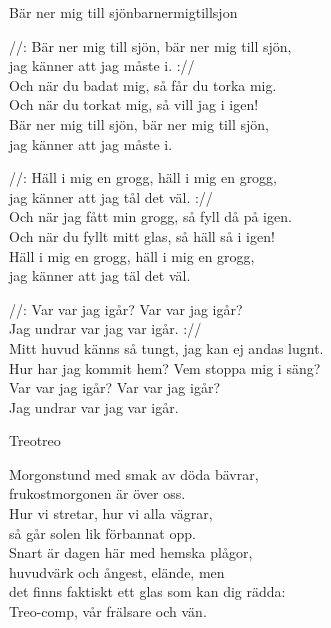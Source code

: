 \newpage

\begin{song}{Bär ner mig till sjön}{barnermigtillsjon}
\begin{vers}
//: Bär ner mig till sjön, bär ner mig till sjön, \\
jag känner att jag måste i. ://\\
Och när du badat mig, så får du torka mig.\\
Och när du torkat mig, så vill jag i igen!\\
Bär ner mig till sjön, bär ner mig till sjön,\\
jag känner att jag måste i.\\
\end{vers}
\begin{vers}
//: Häll i mig en grogg, häll i mig en grogg, \\
jag känner att jag tål det väl. ://\\
Och när jag fått min grogg, så fyll då på igen.\\
Och när du fyllt mitt glas, så häll så i igen!\\
Häll i mig en grogg, häll i mig en grogg,\\
jag känner att jag täl det väl.\\
\end{vers}
\begin{vers}
//: Var var jag igår? Var var jag igår? \\
Jag undrar var jag var igår. ://\\
Mitt huvud känns så tungt, jag kan ej andas lugnt.\\
Hur har jag kommit hem? Vem stoppa mig i säng?\\
Var var jag igår? Var var jag igår?\\
Jag undrar var jag var igår.\\
\end{vers}
\end{song}


\begin{song}{Treo}{treo}
\begin{vers}
Morgonstund med smak av döda bävrar,\\
frukostmorgonen är över oss.\\
Hur vi stretar, hur vi alla vägrar,\\
så går solen lik förbannat opp.\\
Snart är dagen här med hemska plågor,\\
huvudvärk och ångest, elände, men\\
det finns faktiskt ett glas som kan dig rädda:\\
Treo-comp, vår frälsare och vän.\\
\end{vers}
\end{song}

